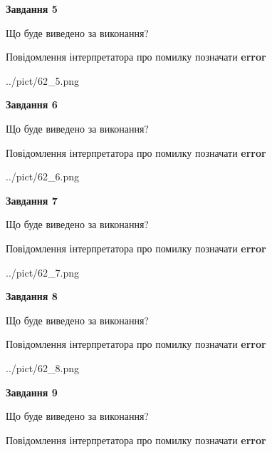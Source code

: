 \documentclass[11pt, ukrainian]{article}
\begin{document}
{\begin {large}
{\begin {center}\textbf{Завдання 5}\end {center}}\par
Що буде виведено за виконання? \par
Повідомлення інтерпретатора про помилку позначати \textbf{error}

\begin{center}
	{../pict/62_5.png}
\end{center}
\newpage

{\begin {center}\textbf{Завдання 6}\end {center}}\par
Що буде виведено за виконання? \par
Повідомлення інтерпретатора про помилку позначати \textbf{error}

\begin{center}
	{../pict/62_6.png}
\end{center}
\newpage

{\begin {center}\textbf{Завдання 7}\end {center}}\par
Що буде виведено за виконання? \par
Повідомлення інтерпретатора про помилку позначати \textbf{error}

\begin{center}
	{../pict/62_7.png}
\end{center}
\newpage

{\begin {center}\textbf{Завдання 8}\end {center}}\par
Що буде виведено за виконання? \par
Повідомлення інтерпретатора про помилку позначати \textbf{error}

\begin{center}
	{../pict/62_8.png}
\end{center}
\newpage

{\begin {center}\textbf{Завдання 9}\end {center}}\par
Що буде виведено за виконання? \par
Повідомлення інтерпретатора про помилку позначати \textbf{error}


\end{large}}
\end{document}
